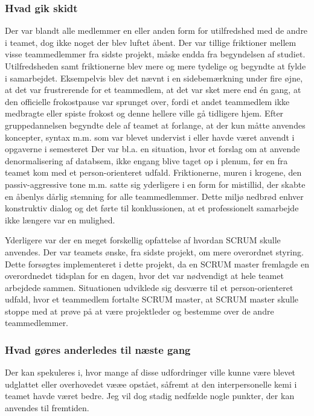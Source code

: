\subsubsection{Hvad gik skidt}
Der var blandt alle medlemmer en eller anden form for utilfredshed med de andre i teamet, dog ikke noget der blev luftet åbent.      
Der var tillige friktioner mellem visse teammedlemmer fra sidste projekt, måske endda fra begyndelsen af studiet. Utilfredsheden samt friktionerne blev mere og mere tydelige og begyndte at fylde i samarbejdet. Eksempelvis blev det nævnt i en sidebemærkning under fire øjne, at det var frustrerende for et teammedlem, at det var sket mere end én gang, at den officielle frokostpause var sprunget over, fordi et andet teammedlem ikke medbragte eller spiste frokost og denne hellere ville gå tidligere hjem. 
Efter gruppedannelsen begyndte dele af teamet at forlange, at der kun måtte anvendes koncepter, syntax m.m. som var blevet undervist i eller havde været anvendt i opgaverne i semesteret Der var bl.a. en situation, hvor et forslag om at anvende denormalisering af databsem, ikke engang blive taget op i plenum, før en fra teamet kom med et person-orienteret udfald.
Friktionerne, muren i krogene, den passiv-aggressive tone m.m. satte sig yderligere i en form for mistillid, der skabte en åbenlys dårlig stemning for alle teammedlemmer. 
Dette miljø nedbrød enhver konstruktiv dialog og det førte til konklussionen, at et professionelt samarbejde ikke længere var en mulighed. 

Yderligere var der en meget forskellig opfattelse af hvordan SCRUM skulle anvendes. Der var teamets ønske, fra sidste projekt, om mere overordnet styring. Dette forsøgtes implementeret i dette projekt, da en SCRUM master fremlagde en overordnedet tidsplan for en dagen, hvor det var nødvendigt at hele teamet arbejdede sammen. Situationen udviklede sig desværre til et person-orienteret udfald, hvor et teammedlem fortalte SCRUM master, at SCRUM master skulle stoppe med at prøve på at være projektleder og bestemme over de andre teammedlemmer.

\subsubsection{Hvad gøres anderledes til næste gang}
Der kan spekuleres i, hvor mange af disse udfordringer ville kunne være blevet udglattet eller overhovedet vææe opstået, såfremt at den interpersonelle kemi i teamet havde været bedre. Jeg vil dog stadig nedfælde nogle punkter, der kan anvendes til fremtiden.

